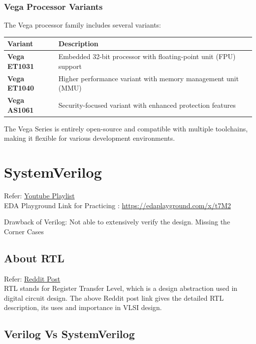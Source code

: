 \documentclass[12pt, a4paper]{article}
\begin{document}
\subsubsection{Vega Processor Variants}
The Vega processor family includes several variants:

\begin{center}
\begin{tabular}{|l|p{}|}
\hline
\textbf{Variant} & \textbf{Description} \\
\hline
\textbf{Vega ET1031} & Embedded 32-bit processor with floating-point unit (FPU) support \\
\hline
\textbf{Vega ET1040} & Higher performance variant with memory management unit (MMU) \\
\hline
\textbf{Vega AS1061} & Security-focused variant with enhanced protection features \\
\hline
\end{tabular}
\end{center}

The Vega Series is entirely open-source and compatible with multiple toolchains, making it flexible for various development environments.

\section{SystemVerilog}

Refer: \href{https://youtube.com/playlist?list=PLqPfWwayuBvMwUjNHfyaX6CTK2KbeL2ga&si=NyddrPqUN_h-WrtD}{Youtube Playlist}\\
EDA Playground Link for Practicing : \url{https://edaplayground.com/x/t7M2}

Drawback of Verilog: Not able to extensively verify the design. Missing the Corner Cases

\subsection{About RTL}

Refer: \href{https://www.reddit.com/r/vlsi_enthusiast/comments/1ffoqd4/what_is_rtl_register_transfer_level_design_in_vlsi/}{Reddit Post}\\ 

RTL stands for Register Transfer Level, which is a design abstraction used in digital circuit design. The above Reddit post link gives the detailed RTL description, its uses and importance in VLSI design.

\subsection{Verilog Vs SystemVerilog}
\end{document}
